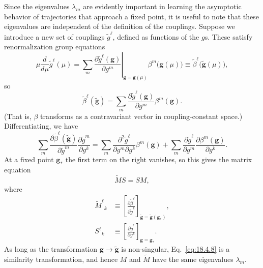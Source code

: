 Since the eigenvalues $\lambda_m$ are evidently important in learning the asymptotic behavior of trajectories that approach a fixed point, it is useful to note that these eigenvalues are independent of the definition of the couplings. Suppose we introduce a new set of couplings $\widetilde g^\ell$, defined as functions of the $g$s. These satisfy renormalization group equations
\[
\mu\frac{d}{d\mu}\widetilde g^\ell(\mu)
=\left.\sum_m\frac{\partial\widetilde g^\ell(\mathbf{g})}{\partial g^m}\right|_{\mathbf{g}=\mathbf{g}(\mu)}
\beta^m\bigl(\mathbf{g}(\mu)\bigr)
\equiv\widetilde\beta^\ell\bigl(\widetilde{\mathbf{g}}(\mu)\bigr),
\]
so
\begin{equation}
\widetilde\beta^\ell(\widetilde{\mathbf{g}})
=\sum_m\frac{\partial\widetilde g^\ell(\mathbf{g})}{\partial g^m}\beta^m(\mathbf{g}).
\tag{18.4.7}\label{eq:18.4.7}
\end{equation}
(That is, $\beta$ transforms as a contravariant vector in coupling-constant space.) Differentiating, we have
\[
\sum_m\frac{\partial\widetilde\beta^\ell(\widetilde{\mathbf{g}})}{\partial\widetilde g^m}
\frac{\partial\widetilde g^m}{\partial g^k}
=\sum_m\frac{\partial^2\widetilde g^\ell}{\partial g^m\partial g^k}\beta^m(\mathbf{g})
+\sum_m\frac{\partial\widetilde g^\ell}{\partial g^m}\frac{\partial\beta^m(\mathbf{g})}{\partial g^k}.
\]
At a fixed point $\mathbf{g}_*$ the first term on the right vanishes, so this gives the matrix equation
\begin{equation}
\widetilde M S=SM,
\tag{18.4.8}\label{eq:18.4.8}
\end{equation}
where
\begin{align}
\widetilde M^\ell{}_k&\equiv
\left[\frac{\partial\widetilde\beta^\ell}{\partial\widetilde g^k}\right]_{\widetilde{\mathbf{g}}=\widetilde{\mathbf{g}}(\mathbf{g}_*)},
\tag{18.4.9}\label{eq:18.4.9}\\
S^\ell{}_k&\equiv
\left[\frac{\partial\widetilde g^\ell}{\partial g^k}\right]_{\mathbf{g}=\mathbf{g}_*}.
\tag{18.4.10}\label{eq:18.4.10}
\end{align}
As long as the transformation $\mathbf{g}\to\widetilde{\mathbf{g}}$ is non-singular, Eq.~\eqref{eq:18.4.8} is a similarity transformation, and hence $M$ and $\widetilde M$ have the same eigenvalues $\lambda_m$.

